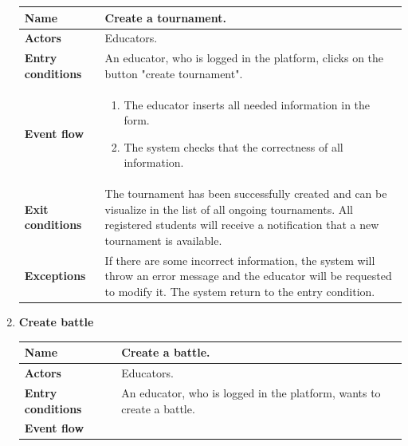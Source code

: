 \begin{enumerate}[label=\textbf{UC.\arabic*}]
\begin{table}[H]
\begin{tabular}{|m{3.2cm}|m{9.8cm}|}
                    \textbf{Name} & Create a tournament. \\
                    \hline
                    \textbf{Actors} & Educators. \\
                    \hline
                    \textbf{Entry conditions}  & An educator, who is logged in the platform, clicks on the button "create tournament". \\
                    \hline
                    \textbf{Event flow}  &  
                    \begin{enumerate}[label=\arabic*.]
                        \item The educator inserts all needed information in the form.
                        \item The system checks that the correctness of all information.
                    \end{enumerate}\\
                    \hline
                    \textbf{Exit conditions}  & The tournament has been successfully created and can be visualize in the list of all ongoing tournaments. All registered students will receive a notification that a new tournament is available.\\
                    \hline
                    \textbf{Exceptions}  & 
                    If there are some incorrect information, the system will throw an error message and the educator will be requested to modify it. The system return to the entry condition. \\
                    \hline 
                \end{tabular}
        \end{table}
        \item {} \textbf{Create battle}
        \begin{table}[H]
    	    \centering
                \renewcommand{\arraystretch}{1.5}
                \begin{tabular}{|m{3.2cm}|m{9.8cm}|}
                    \hline
                    \textbf{Name} & Create a battle. \\
                    \hline
                    \textbf{Actors} & Educators. \\
                    \hline
                    \textbf{Entry conditions}  &  An educator, who is logged in the platform, wants to create a battle.\\
                    \hline
                    \textbf{Event flow}  & 
                    \begin{enumerate}[label=\arabic*.]

\end{enumerate}
\end{tabular}
\end{table}
\end{enumerate}
